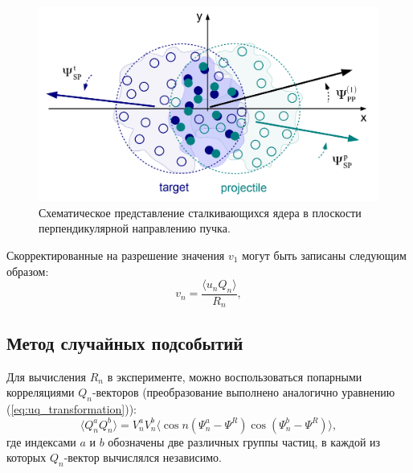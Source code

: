%
\begin{figure}[ht]
\begin{center}
\includegraphics[width=0.75\linewidth]{images/v1_pp_sp.png}
\caption{Схематическое представление сталкивающихся ядера в плоскости перпендикулярной направлению пучка.}
\label{fig:pp_sp_rp}
\end{center}
\end{figure}
%

Скорректированные на разрешение значения $v_1$ могут быть записаны следующим образом: 
%
\begin{equation}
    v_n =  \frac{ \langle u_n Q_n \rangle }{R_n},
    \label{eq:v1_formula}
\end{equation}
%

\subsection{Метод случайных подсобытий}

Для вычисления $R_n$ в эксперименте, можно воспользоваться попарными корреляциями $Q_n$-векторов (преобразование выполнено аналогично уравнению (\ref{eq:uq_transformation})): 
%
\begin{equation}
    \langle Q_n^a Q_n^b \rangle = V^a_n V^b_n \langle \cos n (\Psi^a_n - \Psi^R) \cos(\Psi^b_n - \Psi^R) \rangle,
\end{equation}
%
где индексами $a$ и $b$ обозначены две различных группы частиц, в каждой из которых $Q_n$-вектор вычислялся независимо.

